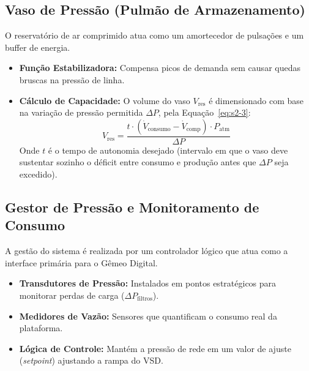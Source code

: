 \documentclass[12pt,a4paper]{article}
\numberwithin{equation}{section}
\numberwithin{table}{section}
\numberwithin{figure}{section}
\begin{document}
	\subsection{\textbf{Vaso de Pressão (Pulmão de Armazenamento)}}
	O reservatório de ar comprimido atua como um amortecedor de pulsações e um buffer de energia.
	\begin{itemize}
		\item \textbf{Função Estabilizadora:} Compensa picos de demanda sem causar quedas bruscas na pressão de linha.
		\item \textbf{Cálculo de Capacidade:} O volume do vaso $V_{\text{res}}$ é dimensionado com base na variação de pressão permitida $\Delta P$, pela Equação~\eqref{eq:s2-3}:
		\begin{equation}\label{eq:s2-3}
 V_{\text{res}} = \frac{t \cdot (\dot{V}_{\text{consumo}} - \dot{V}_{\text{comp}}) \cdot P_{\text{atm}}}{\Delta P} 
\end{equation}
		Onde $t$ é o tempo de autonomia desejado (intervalo em que o vaso deve sustentar sozinho o déficit entre consumo e produção antes que $\Delta P$ seja excedido).
	\end{itemize}
	
	\subsection{\textbf{Gestor de Pressão e Monitoramento de Consumo}}
	A gestão do sistema é realizada por um controlador lógico que atua como a interface primária para o Gêmeo Digital.
	\begin{itemize}
		\item \textbf{Transdutores de Pressão:} Instalados em pontos estratégicos para monitorar perdas de carga ($\Delta P_{\text{filtros}}$).
		\item \textbf{Medidores de Vazão:} Sensores que quantificam o consumo real da plataforma.
		\item \textbf{Lógica de Controle:} Mantém a pressão de rede em um valor de ajuste (\textit{setpoint}) ajustando a rampa do VSD.
	\end{itemize}
\end{document}
